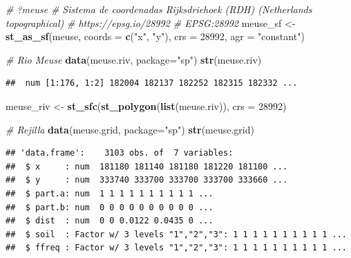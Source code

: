 \documentclass[
]{book}
\newenvironment{Shaded}{\begin{snugshade}}{\end{snugshade}}
\newcommand{\AttributeTok}[1]{\textcolor[rgb]{0.13,0.29,0.53}{#1}}
\newcommand{\CommentTok}[1]{\textcolor[rgb]{0.56,0.35,0.01}{\textit{#1}}}
\newcommand{\DecValTok}[1]{\textcolor[rgb]{0.00,0.00,0.81}{#1}}
\newcommand{\FunctionTok}[1]{\textcolor[rgb]{0.13,0.29,0.53}{\textbf{#1}}}
\newcommand{\NormalTok}[1]{#1}
\newcommand{\OtherTok}[1]{\textcolor[rgb]{0.56,0.35,0.01}{#1}}
\newcommand{\StringTok}[1]{\textcolor[rgb]{0.31,0.60,0.02}{#1}}
\theoremstyle{break}
\theoremstyle{definition}
\theoremstyle{definition}
\theoremstyle{definition}
\theoremstyle{definition}
\theoremstyle{remark}
\begin{document}
\begin{Shaded}
\begin{Highlighting}[]
\CommentTok{\# ?meuse }
\CommentTok{\# Sistema de coordenadas Rijksdriehoek (RDH) (Netherlands topographical) }
\CommentTok{\# https://epsg.io/28992 \# EPSG:28992}
\NormalTok{meuse\_sf }\OtherTok{\textless{}{-}} \FunctionTok{st\_as\_sf}\NormalTok{(meuse, }\AttributeTok{coords =} \FunctionTok{c}\NormalTok{(}\StringTok{"x"}\NormalTok{, }\StringTok{"y"}\NormalTok{), }\AttributeTok{crs =} \DecValTok{28992}\NormalTok{, }\AttributeTok{agr =} \StringTok{"constant"}\NormalTok{)}

\CommentTok{\# Rio Meuse }
\FunctionTok{data}\NormalTok{(meuse.riv, }\AttributeTok{package=}\StringTok{"sp"}\NormalTok{)}
\FunctionTok{str}\NormalTok{(meuse.riv)}
\end{Highlighting}
\end{Shaded}

\begin{verbatim}
##  num [1:176, 1:2] 182004 182137 182252 182315 182332 ...
\end{verbatim}

\begin{Shaded}
\begin{Highlighting}[]
\NormalTok{meuse\_riv }\OtherTok{\textless{}{-}} \FunctionTok{st\_sfc}\NormalTok{(}\FunctionTok{st\_polygon}\NormalTok{(}\FunctionTok{list}\NormalTok{(meuse.riv)), }\AttributeTok{crs =} \DecValTok{28992}\NormalTok{)}

\CommentTok{\# Rejilla}
\FunctionTok{data}\NormalTok{(meuse.grid, }\AttributeTok{package=}\StringTok{"sp"}\NormalTok{)}
\FunctionTok{str}\NormalTok{(meuse.grid)}
\end{Highlighting}
\end{Shaded}

\begin{verbatim}
## 'data.frame':    3103 obs. of  7 variables:
##  $ x     : num  181180 181140 181180 181220 181100 ...
##  $ y     : num  333740 333700 333700 333700 333660 ...
##  $ part.a: num  1 1 1 1 1 1 1 1 1 1 ...
##  $ part.b: num  0 0 0 0 0 0 0 0 0 0 ...
##  $ dist  : num  0 0 0.0122 0.0435 0 ...
##  $ soil  : Factor w/ 3 levels "1","2","3": 1 1 1 1 1 1 1 1 1 1 ...
##  $ ffreq : Factor w/ 3 levels "1","2","3": 1 1 1 1 1 1 1 1 1 1 ...
\end{verbatim}
\end{document}
